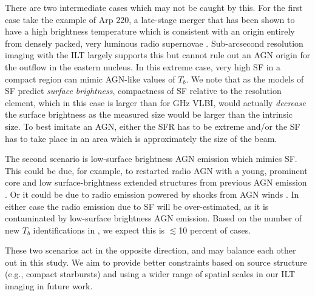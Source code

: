 \documentclass[usenatbib,fleqn,letters]{mnras}
\newcommand{\sarc}{$^{\prime\prime}\!\!$}
\begin{document}
There are two intermediate cases which may not be caught by this. For the first case take the example of Arp 220, a late-stage merger that has been shown to have a high brightness temperature which is consistent with an origin entirely from densely packed, very luminous radio supernovae \citep{smith_starburst_1998,lonsdale_vlbi_2006}. Sub-arcsecond resolution imaging with the ILT largely supports this \citep{varenius_subarcsecond_2016} but cannot rule out an AGN origin for the outflow in the eastern nucleus. In this extreme case, very high SF in a compact region can mimic AGN-like values of $T_b$. We note that as the models of SF predict \textit{surface brightness}, compactness of SF relative to the resolution element, which in this case is larger than for GHz VLBI, would actually \textit{decrease} the surface brightness as the measured size would be larger than the intrinsic size. To best imitate an AGN, either the SFR has to be extreme and/or the SF has to take place in an area which is approximately the size of the beam. 


The second scenario is low-surface brightness AGN emission which mimics SF. This could be due, for example, to restarted radio AGN with a young, prominent core and low surface-brightness extended structures from previous AGN emission \citep[e.g.][]{mingo_revisiting_2019}. Or it could be due to radio emission powered by shocks from AGN winds \citep[e.g.,][]{zakamska_quasar_2014,rankine_placing_2021,petley_connecting_2022}. In either case the radio emission due to SF will be over-estimated, as it is contaminated by low-surface brightness AGN emission.  Based on the number of new $T_b$ identifications in , we expect this is $\lesssim$10 percent of cases. 

These two scenarios act in the opposite direction, and may balance each other out in this study. We aim to provide better constraints based on source structure (e.g., compact starbursts) and using a wider range of spatial scales in our ILT imaging \citep[e.g. the 1.\sarc\ 2 resolution imaging in][]{de_jong_into_2024} in future work. 
\end{document}
